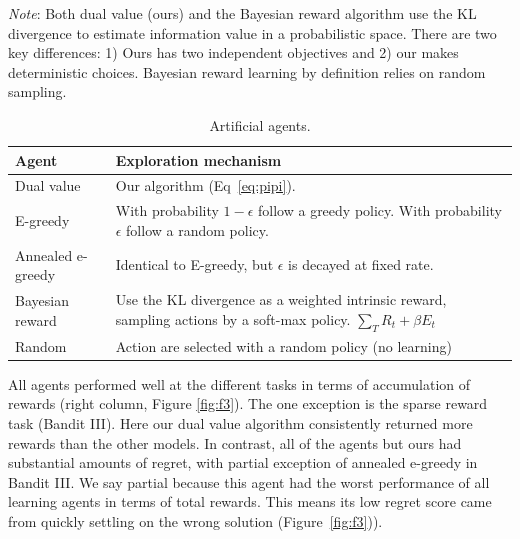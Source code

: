 \documentclass[9pt,lineno]{elife}
\begin{document}
\textit{Note}: Both dual value (ours) and the Bayesian reward algorithm use the KL divergence to estimate information value in a probabilistic space. There are two key differences: 1) Ours has two independent objectives and 2) our makes deterministic choices. Bayesian reward learning by definition relies on random sampling.

\begin{table}[] 
    \centering 
	\caption{Artificial agents.} \label{tab:agents} 
	\begin{tabular}
		{|l|L|} \hline \textbf{Agent} & \textbf{Exploration mechanism} \\
		\hline Dual value & Our algorithm (Eq~\ref{eq:pipi}). \\
		\hline E-greedy & With probability $1-\epsilon$ follow a greedy policy. With probability $\epsilon$ follow a random policy. \\
		\hline Annealed e-greedy & Identical to E-greedy, but $\epsilon$ is decayed at fixed rate. \\
		\hline Bayesian reward & Use the KL divergence as a weighted intrinsic reward, sampling actions by a soft-max policy. $\sum_T R_t + \beta E_t$ \\
		\hline Random & Action are selected with a random policy (no learning) \\
		\hline 
	\end{tabular}
\end{table}

All agents performed well at the different tasks in terms of accumulation of rewards (right column, Figure \ref{fig:f3}). The one exception is the sparse reward task (Bandit III). Here our dual value algorithm consistently returned more rewards than the other models. In contrast, all of the agents but ours had substantial amounts of regret, with partial exception of annealed e-greedy in Bandit III. We say partial because this agent had the worst performance of all learning agents in terms of total rewards. This means its low regret score came from quickly settling on the wrong solution (Figure~\ref{fig:f3})). 

\end{document}
